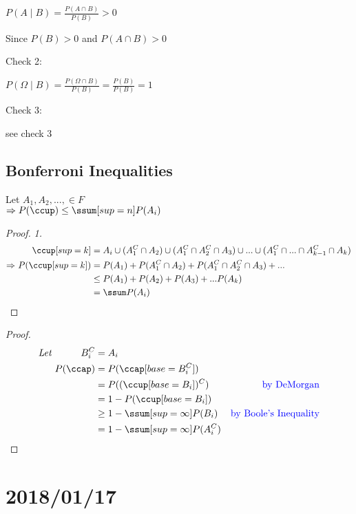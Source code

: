 \documentclass[12pt]{article}
\newcommand{\mathcomment}[0]{\quad\color{blue}}
\begin{document}
\(P(A \mid B) = \frac{P(A \cap B)}{P(B)} > 0\)

Since \(P(B) > 0\) and \(P(A \cap B) > 0\)

Check 2:

\(P(\Omega \mid B) = \frac{P(\Omega \cap B)}{P(B)} = \frac{P(B)}{P(B)} = 1\)

Check 3:

see check 3

\subsection{Bonferroni Inequalities}
Let $A_1, A_2, ..., \in F$ \\
$\Rightarrow P(\ccup) \le \ssum[sup=n] P(A_i)$

\begin{proof} \textit{1.}
	\begin{equation}
		\begin{alignedat}{2}
			&& \ccup[sup=k] &= A_i \cup (A^C_1 \cap A_2) \cup (A^C_1 \cap A^C_2 \cap A_3) \cup ... \cup (A^C_1 \cap ... \cap A^C_{k-1} \cap A_k) \\
			\Rightarrow \ && P(\ccup[sup=k]) &= P(A_1) + P(A^C_1 \cap A_2) + P(A^C_1 \cap A^C_2 \cap A_3) + ... \\
			&&& \le P(A_1) + P(A_2) + P(A_3) + ... P(A_k) \\
			&&&= \ssum P(A_i)
		\end{alignedat}
	\end{equation}
\end{proof}

\begin{proof}
	\begin{equation}
		\begin{alignedat}{3}
		\textit{Let } && B^C_i &= A_i &\\
		&& P(\ccap) &= P(\ccap[base=B^C_i]) &\\
		&& &= P((\ccup[base=B_i])^C) & \mathcomment \text{by DeMorgan} \\
		&& &= 1 - P(\ccup[base=B_i]) &\\
		&& & \ge 1 - \ssum[sup=\infty] P(B_i) & \mathcomment \text{by Boole's Inequality} \\
		&& &= 1 - \ssum[sup=\infty]P(A^C_i)
		\end{alignedat}
	\end{equation}
\end{proof}

\section{2018/01/17}
\end{document}
